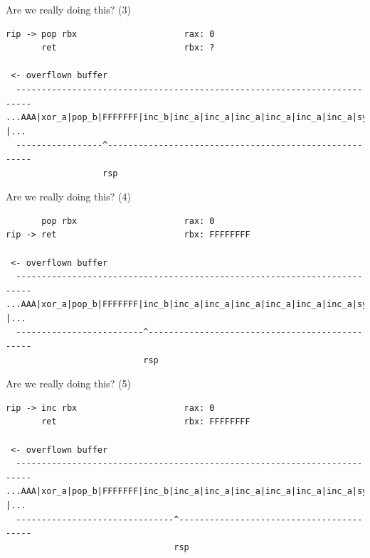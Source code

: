 \documentclass[9pt,aspectratio=169]{beamer}
\begin{document}
\begin{frame}[label={sec:org2d16d7b},fragile]{Are we really doing this? (3)}
 \begin{verbatim}
rip -> pop rbx                     rax: 0
       ret                         rbx: ?

 <- overflown buffer 
  -------------------------------------------------------------------------
...AAA|xor_a|pop_b|FFFFFFF|inc_b|inc_a|inc_a|inc_a|inc_a|inc_a|inc_a|sys |...
  -----------------^-------------------------------------------------------
                   rsp
\end{verbatim}
\end{frame}

\begin{frame}[label={sec:orgdfe096f},fragile]{Are we really doing this? (4)}
 \begin{verbatim}
       pop rbx                     rax: 0
rip -> ret                         rbx: FFFFFFFF

 <- overflown buffer 
  -------------------------------------------------------------------------
...AAA|xor_a|pop_b|FFFFFFF|inc_b|inc_a|inc_a|inc_a|inc_a|inc_a|inc_a|sys |...
  -------------------------^-----------------------------------------------
                           rsp
\end{verbatim}
\end{frame}

\begin{frame}[label={sec:orgd85f0d0},fragile]{Are we really doing this? (5)}
 \begin{verbatim}
rip -> inc rbx                     rax: 0
       ret                         rbx: FFFFFFFF

 <- overflown buffer 
  -------------------------------------------------------------------------
...AAA|xor_a|pop_b|FFFFFFF|inc_b|inc_a|inc_a|inc_a|inc_a|inc_a|inc_a|sys |...
  -------------------------------^-----------------------------------------
                                 rsp
\end{verbatim}
\end{frame}
\end{document}
